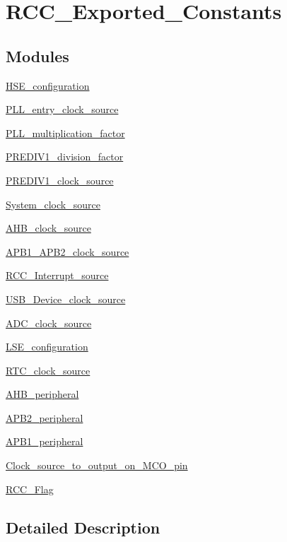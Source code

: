 \hypertarget{group___r_c_c___exported___constants}{}\section{R\+C\+C\+\_\+\+Exported\+\_\+\+Constants}
\label{group___r_c_c___exported___constants}
\subsection*{Modules}
\begin{DoxyCompactItemize}
\item 
\mbox{\hyperlink{group___h_s_e__configuration}{H\+S\+E\+\_\+configuration}}
\item 
\mbox{\hyperlink{group___p_l_l__entry__clock__source}{P\+L\+L\+\_\+entry\+\_\+clock\+\_\+source}}
\item 
\mbox{\hyperlink{group___p_l_l__multiplication__factor}{P\+L\+L\+\_\+multiplication\+\_\+factor}}
\item 
\mbox{\hyperlink{group___p_r_e_d_i_v1__division__factor}{P\+R\+E\+D\+I\+V1\+\_\+division\+\_\+factor}}
\item 
\mbox{\hyperlink{group___p_r_e_d_i_v1__clock__source}{P\+R\+E\+D\+I\+V1\+\_\+clock\+\_\+source}}
\item 
\mbox{\hyperlink{group___system__clock__source}{System\+\_\+clock\+\_\+source}}
\item 
\mbox{\hyperlink{group___a_h_b__clock__source}{A\+H\+B\+\_\+clock\+\_\+source}}
\item 
\mbox{\hyperlink{group___a_p_b1___a_p_b2__clock__source}{A\+P\+B1\+\_\+\+A\+P\+B2\+\_\+clock\+\_\+source}}
\item 
\mbox{\hyperlink{group___r_c_c___interrupt__source}{R\+C\+C\+\_\+\+Interrupt\+\_\+source}}
\item 
\mbox{\hyperlink{group___u_s_b___device__clock__source}{U\+S\+B\+\_\+\+Device\+\_\+clock\+\_\+source}}
\item 
\mbox{\hyperlink{group___a_d_c__clock__source}{A\+D\+C\+\_\+clock\+\_\+source}}
\item 
\mbox{\hyperlink{group___l_s_e__configuration}{L\+S\+E\+\_\+configuration}}
\item 
\mbox{\hyperlink{group___r_t_c__clock__source}{R\+T\+C\+\_\+clock\+\_\+source}}
\item 
\mbox{\hyperlink{group___a_h_b__peripheral}{A\+H\+B\+\_\+peripheral}}
\item 
\mbox{\hyperlink{group___a_p_b2__peripheral}{A\+P\+B2\+\_\+peripheral}}
\item 
\mbox{\hyperlink{group___a_p_b1__peripheral}{A\+P\+B1\+\_\+peripheral}}
\item 
\mbox{\hyperlink{group___clock__source__to__output__on___m_c_o__pin}{Clock\+\_\+source\+\_\+to\+\_\+output\+\_\+on\+\_\+\+M\+C\+O\+\_\+pin}}
\item 
\mbox{\hyperlink{group___r_c_c___flag}{R\+C\+C\+\_\+\+Flag}}
\end{DoxyCompactItemize}


\subsection{Detailed Description}
